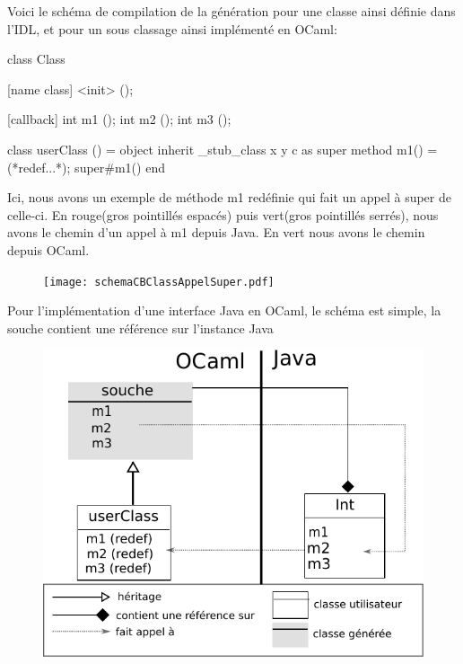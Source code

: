 \documentclass[a4paper, 11pt]{article}
\begin{document}
Voici le schéma de compilation de la génération pour une classe ainsi définie dans l'IDL, et pour un sous classage ainsi implémenté en OCaml:
\begin{multicols}{2}
\begin{idlEx}
 class Class {

   [name class] <init> ();

   [callback] int m1 ();
   int m2 ();
   int m3 ();
 }
\end{idlEx}

\begin{OCamlEx}
class userClass ()  =
  object
    inherit _stub_class x y c as super
    method m1() = (*redef...*);
                  super#m1()
  end
\end{OCamlEx}

\end{multicols}
Ici, nous avons un exemple de méthode m1 redéfinie qui fait un appel à super de celle-ci.
En rouge(gros pointillés espacés) puis vert(gros pointillés serrés), nous avons le chemin d'un appel à m1 depuis Java.
En vert nous avons le chemin depuis OCaml.
\begin{figure}[h!]
  \centering
  \texttt{[image: schemaCBClassAppelSuper.pdf]}
\end{figure}

Pour l'implémentation d'une interface Java en OCaml, le schéma est simple, la souche contient une référence sur l'instance Java 

\begin{figure}[h!]
  \centering
  \includegraphics[scale=0.7]{schemaCBIntSimple.pdf}
\end{figure}
\end{document}
